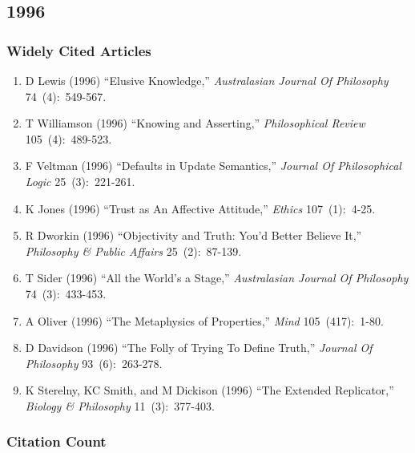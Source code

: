 \documentclass[
  10pt,
  letterpaper,
  DIV=11,
  numbers=noendperiod,
  twoside]{scrartcl}
\providecommand{\tightlist}{%
  \setlength{\itemsep}{0pt}\setlength{\parskip}{0pt}}\usepackage{longtable,booktabs,array}
\begin{document}
\newpage

\subsection{1996}\label{sec-s1996}

\subsubsection*{Widely Cited Articles}\label{widely-cited-articles-40}

\begin{enumerate}
\def\labelenumi{\arabic{enumi}.}
\tightlist
\item
  D Lewis (1996) ``Elusive Knowledge,'' \emph{Australasian Journal Of
  Philosophy} 74~(4):~549-567.
\item
  T Williamson (1996) ``Knowing and Asserting,'' \emph{Philosophical
  Review} 105~(4):~489-523.
\item
  F Veltman (1996) ``Defaults in Update Semantics,'' \emph{Journal Of
  Philosophical Logic} 25~(3):~221-261.
\item
  K Jones (1996) ``Trust as An Affective Attitude,'' \emph{Ethics}
  107~(1):~4-25.
\item
  R Dworkin (1996) ``Objectivity and Truth: You'd Better Believe It,''
  \emph{Philosophy \& Public Affairs} 25~(2):~87-139.
\item
  T Sider (1996) ``All the World's a Stage,'' \emph{Australasian Journal
  Of Philosophy} 74~(3):~433-453.
\item
  A Oliver (1996) ``The Metaphysics of Properties,'' \emph{Mind}
  105~(417):~1-80.
\item
  D Davidson (1996) ``The Folly of Trying To Define Truth,''
  \emph{Journal Of Philosophy} 93~(6):~263-278.
\item
  K Sterelny, KC Smith, and M Dickison (1996) ``The Extended
  Replicator,'' \emph{Biology \& Philosophy} 11~(3):~377-403.
\end{enumerate}

\subsubsection*{Citation Count}\label{sec-count-1996}
\end{document}
